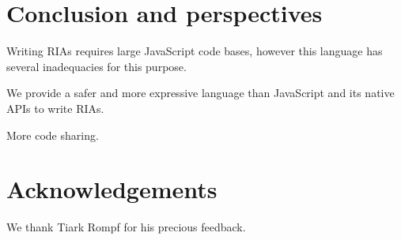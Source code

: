 \documentclass[american,english,runningheads]{llncs}
\newcommand{\eg}{\emph{e.g.}}
\begin{document}
% 
% 
% 

\section{Conclusion and perspectives}
\label{discussion}

Writing RIAs requires large JavaScript code bases, however this language has several inadequacies for this purpose.

We provide a safer and more expressive language than JavaScript and its native APIs to write RIAs.

More code sharing.

\section{Acknowledgements}

We thank Tiark Rompf for his precious feedback.



\end{document}
